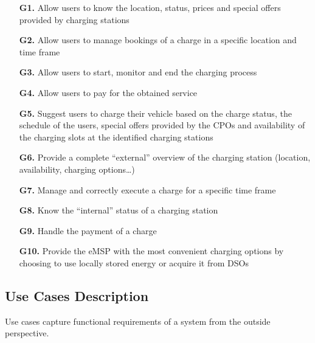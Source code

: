 \documentclass[12pt]{report}
\begin{document}
\begin{itemize}
\item[\textbf{G1.}]   Allow users to know the location, status, prices and special offers provided by charging stations
\item[\textbf{G2.}]  Allow users to manage bookings of  a charge in a specific location and time frame
\item[\textbf{G3.}] Allow users to start, monitor and end the charging process
\item[\textbf{G4.}] Allow users to pay for the obtained service
\item[\textbf{G5.}] Suggest users to charge their vehicle based on the charge status, the schedule of the users, special offers provided by the CPOs and availability of the charging slots at the identified charging stations
\item[\textbf{G6.}] Provide a complete “external” overview of the charging station (location, availability, charging options…)
\item[\textbf{G7.}] Manage and correctly execute a charge for a specific time frame
\item[\textbf{G8.}] Know the “internal” status of a charging station
\item[\textbf{G9.}] Handle the payment of a charge
\item[\textbf{G10.}] Provide the eMSP with the most convenient charging options by choosing to use locally stored energy or acquire it from DSOs
\end{itemize}
    
\clearpage
\clearpage
\newpage

\subsection{Use Cases Description}  
Use cases capture functional requirements of a system from the outside perspective.\\
\end{document}
